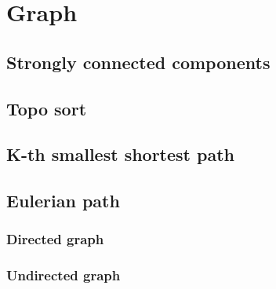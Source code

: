 \section{Graph}

\subsection{Strongly connected components}

\subsection{Topo sort}

\subsection{K-th smallest shortest path}

\subsection{Eulerian path}
	\subsubsection{Directed graph}

	\subsubsection{Undirected graph}

